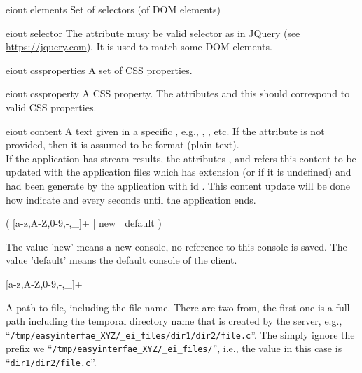 \bigskip
\xmlstruct
{eiout}
{elements}
{%
  Set of selectors (of DOM elements)
} 

\bigskip
\xmlstruct
{eiout}
{selector}
{%
%
  The attribute  musy be valid selector as in
  JQuery (see \url{https://jquery.com}). It is used to match some DOM
  elements.
%
}


\bigskip
\xmlstruct
{eiout}
{cssproperties}
{%
%
A set of CSS properties.
%
}


\bigskip
\xmlstruct
{eiout}
{cssproperty}
{%
%
  A CSS property. The attributes  and this
   should correspond to valid CSS properties.
%
}


\bigskip
\xmlstruct
{eiout}
{content}
{%
%
  A text given in a specific , e.g.,
  , , etc. If the
  attribute  is not provided, then it is assumed
  to be  format (plain text).\\
%
  If the application has stream results, the attributes
  ,  and
   refers this content to be updated with
  the application files which has extension 
  (or  if it is undefined) and had been generate by the
  application with id  . This content update
  will be done how  indicate and every
   seconds until the application ends. 
%
}

\bigskip
\noindent
{}

( [a-z,A-Z,0-9,-,\_]+ | new | default )

\medskip
\noindent
The value 'new' means a new console, no reference to this console is
saved. The value 'default' means the default console of the client.


\bigskip
\noindent
{}

 [a-z,A-Z,0-9,-,\_]+

\bigskip
\noindent
{}

\noindent
A path to file, including the file name. There are two from, the first
one is a full path including the temporal directory name that is
created by the server, e.g.,
``\texttt{/tmp/easyinterfae\_XYZ/\_ei\_files/dir1/dir2/file.c}''. The
simply ignore the prefix we
``\texttt{/tmp/easyinterfae\_XYZ/\_ei\_files/}'', i.e., the value in
this case is ``\texttt{dir1/dir2/file.c}''.


